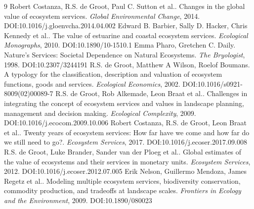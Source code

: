 \documentclass[11pt]{article}
\begin{document}
\begin{thebibliography}{9}
 Robert Costanza, R.S. de Groot, Paul C. Sutton et al.. Changes in the global value of ecosystem services. \emph{Global Environmental Change}, 2014. DOI:10.1016/j.gloenvcha.2014.04.002
 Edward B. Barbier, Sally D. Hacker, Chris Kennedy et al.. The value of estuarine and coastal ecosystem services. \emph{Ecological Monographs}, 2010. DOI:10.1890/10-1510.1
 Emma Pharo, Gretchen C. Daily. Nature's Services: Societal Dependence on Natural Ecosystems. \emph{The Bryologist}, 1998. DOI:10.2307/3244191
 R.S. de Groot, Matthew A Wilson, Roelof Boumans. A typology for the classification, description and valuation of ecosystem functions, goods and services. \emph{Ecological Economics}, 2002. DOI:10.1016/s0921-8009(02)00089-7
 R.S. de Groot, Rob Alkemade, Leon Braat et al.. Challenges in integrating the concept of ecosystem services and values in landscape planning, management and decision making. \emph{Ecological Complexity}, 2009. DOI:10.1016/j.ecocom.2009.10.006
 Robert Costanza, R.S. de Groot, Leon Braat et al.. Twenty years of ecosystem services: How far have we come and how far do we still need to go?. \emph{Ecosystem Services}, 2017. DOI:10.1016/j.ecoser.2017.09.008
 R.S. de Groot, Luke Brander, Sander van der Ploeg et al.. Global estimates of the value of ecosystems and their services in monetary units. \emph{Ecosystem Services}, 2012. DOI:10.1016/j.ecoser.2012.07.005
 Erik Nelson, Guillermo Mendoza, James Regetz et al.. Modeling multiple ecosystem services, biodiversity conservation, commodity production, and tradeoffs at landscape scales. \emph{Frontiers in Ecology and the Environment}, 2009. DOI:10.1890/080023
\end{thebibliography}
\end{document}
